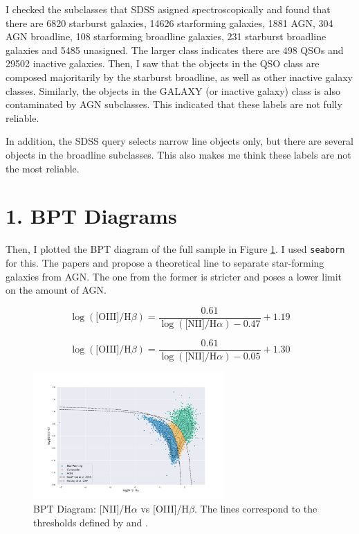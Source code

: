 \documentclass[letterpaper, oneside]{article}
\begin{document}
	I checked the subclasses that SDSS asigned spectroscopically and found that there are 6820 starburst galaxies, 14626 starforming galaxies, 1881 AGN, 304 AGN broadline, 108 starforming broadline galaxies, 231 starburst broadline galaxies and 5485 unasigned. The larger class indicates there are 498 QSOs and 29502 inactive galaxies. Then, I saw that the objects in the QSO class are composed majoritarily by the starburst broadline, as well as other inactive galaxy classes. Similarly, the objects in the GALAXY (or inactive galaxy) class is also contaminated by AGN subclasses. This indicated that these labels are not fully reliable.
	
	In addition, the SDSS query selects narrow line objects only, but there are several objects in the broadline subclasses. This also makes me think these labels are not the most reliable.
	
	\section*{1. BPT Diagrams}
	
	Then, I plotted the BPT diagram of the full sample in Figure \ref{fig:BPT_niiHa_oiiiHb}. I used \texttt{seaborn} \cite{Waskom_2021} for this. The papers \cite{Kewley_2001} and \cite{Kauffmann_2003} propose a theoretical line to separate star-forming galaxies from AGN. The one from the former is stricter and poses a lower limit on the amount of AGN.
	
	\begin{equation} \label{kewley}
		\log{ \left(  \text{[OIII]} / {\text{H}\beta} \right)  } = \frac{0.61}{\log{ \left(  \text{[NII]} / {\text{H}\alpha} \right)  } - 0.47} + 1.19
	\end{equation}
	
	\begin{equation} \label{kauffman}
		\log{ \left(  \text{[OIII]} / {\text{H}\beta} \right)  } = \frac{0.61}{\log{ \left( \text{[NII]} / {\text{H}\alpha} \right)  } - 0.05} + 1.30
	\end{equation}
	
	\begin{figure}[H]
		\centering
		\includegraphics[width=0.65\textwidth]{../BPT_Diagrams/BPT_niiHa_oiiiHb.pdf}
		\caption{BPT Diagram: [NII]/H$\alpha$ vs [OIII]/H$\beta$. The lines correspond to the thresholds defined by \cite{Kewley_2001} and \cite{Kauffmann_2003}.}
		\label{fig:BPT_niiHa_oiiiHb}
	\end{figure}
\end{document}
